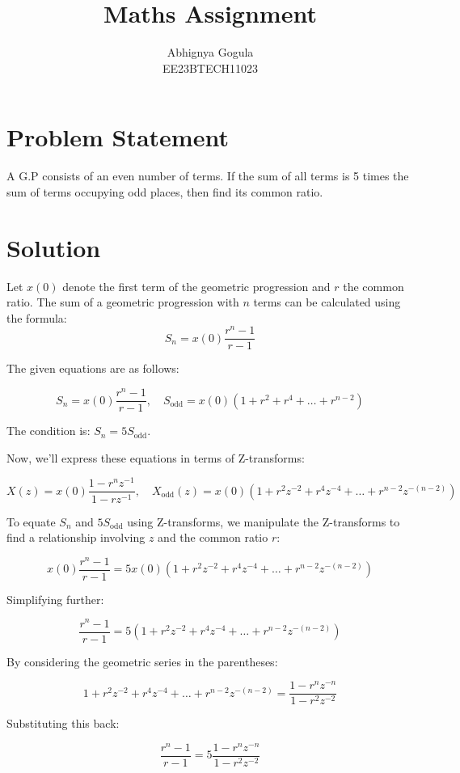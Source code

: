 \documentclass{article}
\begin{document}
\title{Maths Assignment}
\author{Abhignya Gogula\\
        EE23BTECH11023}
\maketitle

\section*{Problem Statement}
A G.P consists of an even number of terms. If the sum of all terms is 5 times the sum of terms occupying odd places, then find its common ratio.

\section*{Solution}
Let \( x(0) \) denote the first term of the geometric progression and \( r \) the common ratio. The sum of a geometric progression with \( n \) terms can be calculated using the formula:
\[ S_n = x(0) \frac{{r^n - 1}}{{r - 1}} \]

The given equations are as follows:

\[
S_n = x(0) \frac{r^n - 1}{r - 1}, \quad S_{\text{odd}} = x(0) (1 + r^2 + r^4 + \ldots + r^{n-2})
\]

The condition is: $S_n = 5  S_{\text{odd}}$.

Now, we'll express these equations in terms of Z-transforms:

\[
X(z) = x(0) \frac{1 - r^nz^{-1}}{1 - rz^{-1}}, \quad X_{\text{odd}}(z) = x(0) (1 + r^2z^{-2} + r^4z^{-4} + \ldots + r^{n-2}z^{-(n-2)})
\]

To equate $S_n$ and $5  S_{\text{odd}}$ using Z-transforms, we manipulate the Z-transforms to find a relationship involving $z$ and the common ratio $r$:

\[
x(0) \frac{r^n - 1}{r - 1} = 5  x(0) (1 + r^2z^{-2} + r^4z^{-4} + \ldots + r^{n-2}z^{-(n-2)})
\]

Simplifying further:

\[
\frac{r^n - 1}{r - 1} = 5  (1 + r^2z^{-2} + r^4z^{-4} + \ldots + r^{n-2}z^{-(n-2)})
\]

By considering the geometric series in the parentheses:

\[
1 + r^2z^{-2} + r^4z^{-4} + \ldots + r^{n-2}z^{-(n-2)} = \frac{1 - r^n z^{-n}}{1 - r^2z^{-2}}
\]

Substituting this back:

\[
\frac{r^n - 1}{r - 1} = 5 \frac{1 - r^n z^{-n}}{1 - r^2z^{-2}}
\]
\end{document}
